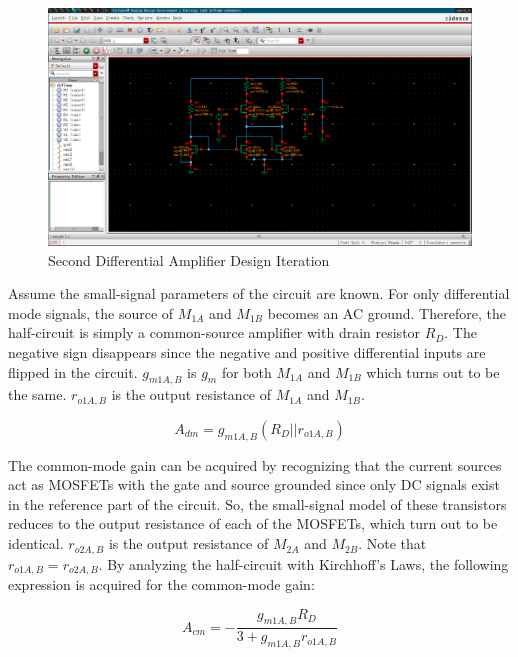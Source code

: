 \FloatBarrier

\begin{figure}[h!]
	\centering
	\includegraphics[scale=0.75]{../images/diff_amp_2.PNG}
	\caption{Second Differential Amplifier Design Iteration}
	\label{fig:diff_amp_2}
\end{figure}

\FloatBarrier

Assume the small-signal parameters of the circuit are known.
For only differential mode signals, the source of $M_{1A}$ and $M_{1B}$ becomes an AC ground.
Therefore, the half-circuit is simply a common-source amplifier with drain resistor $R_{D}$.
The negative sign disappears since the negative and positive differential inputs are flipped in the circuit.
$g_{m1A,B}$ is $g_{m}$ for both $M_{1A}$ and $M_{1B}$ which turns out to be the same.
$r_{o1A,B}$ is the output resistance of $M_{1A}$ and $M_{1B}$.

\begin{equation}
	\label{eq:dm_gain}
	A_{dm} = g_{m1A,B} ( R_{D} || r_{o1A,B} )
\end{equation}

The common-mode gain can be acquired by recognizing that the current sources act as MOSFETs with the gate and source grounded since only DC signals exist in the reference part of the circuit.
So, the small-signal model of these transistors reduces to the output resistance of each of the MOSFETs, which turn out to be identical.
$r_{o2A,B}$ is the output resistance of $M_{2A}$ and $M_{2B}$.
Note that $r_{o1A,B} = r_{o2A,B}$.
By analyzing the half-circuit with Kirchhoff's Laws, the following expression is acquired for the common-mode gain:

\begin{equation}
	\label{eq:cm_gain}
	A_{cm} = - \frac{ g_{m1A,B} R_{D} }{ 3 + g_{m1A,B} r_{o1A,B} }
\end{equation}

